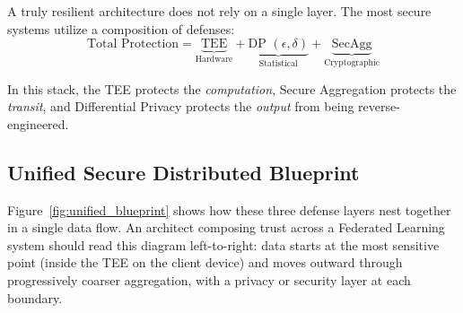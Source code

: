 A truly resilient architecture does not rely on a single layer. The most secure systems utilize a composition of defenses:
\begin{equation}
\text{Total Protection} = \underbrace{\text{TEE}}_{\text{Hardware}} + \underbrace{\text{DP } (\epsilon, \delta)}_{\text{Statistical}} + \underbrace{\text{SecAgg}}_{\text{Cryptographic}}
\end{equation}

In this stack, the TEE protects the \emph{computation}, Secure Aggregation protects the \emph{transit}, and Differential Privacy protects the \emph{output} from being reverse-engineered.

\subsection{Unified Secure Distributed Blueprint}
\label{subsec:unified_blueprint}

Figure~\ref{fig:unified_blueprint} shows how these three defense layers nest together in a single data flow. An architect composing trust across a Federated Learning system should read this diagram left-to-right: data starts at the most sensitive point (inside the TEE on the client device) and moves outward through progressively coarser aggregation, with a privacy or security layer at each boundary.

